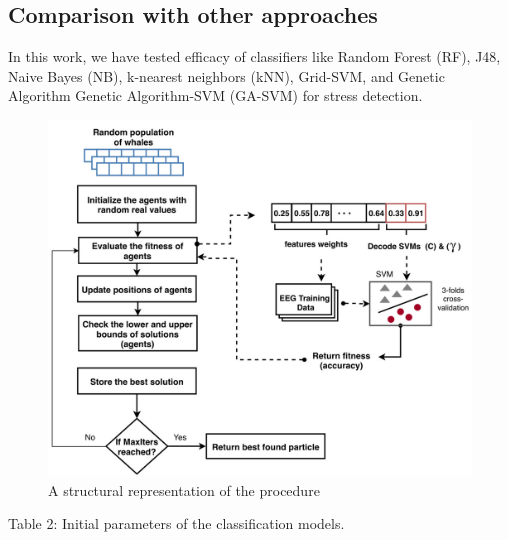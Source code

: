 \subsection{Comparison with other approaches}

In this work, we have tested efficacy of classifiers like Random Forest (RF), J48, Naive Bayes (NB), k-nearest neighbors (kNN), Grid-SVM, and Genetic Algorithm Genetic Algorithm-SVM (GA-SVM) for stress detection.

\begin{figure}[htbp]
\centering
\includegraphics[width=0.8\linewidth]{images/803c589ba4f13b47d3842e8dcc603380d2dd4363175f03a417f4b721e13f7b75.jpg}
\caption{A structural representation of the procedure}
\label{fig:7}
\end{figure}


Table 2: Initial parameters of the classification models.


